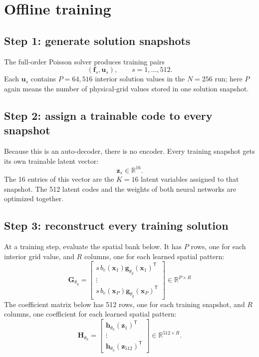 \documentclass[11pt]{article}
\newcommand{\mat}[1]{\mathbf{#1}}
\newcommand{\vect}[1]{\mathbf{#1}}
\newcommand{\R}{\mathbb{R}}
\begin{document}
\section{Offline training}

\subsection{Step 1: generate solution snapshots}

The full-order Poisson solver produces training pairs
\begin{equation}
  (\vect{f}_s,\vect{u}_s),
  \qquad s=1,\ldots,512.
\end{equation}
Each $\vect{u}_s$ contains $P=64{,}516$ interior solution values in the
$N=256$ run; here $P$ again means the number of physical-grid values stored in
one solution snapshot.

\subsection{Step 2: assign a trainable code to every snapshot}

Because this is an auto-decoder, there is no encoder.  Every training snapshot
gets its own trainable latent vector:
\begin{equation}
  \vect{z}_s\in\R^{16}.
\end{equation}
The 16 entries of this vector are the $K=16$ latent variables assigned to that
snapshot.  The 512 latent codes and the weights of both neural networks are
optimized together.

\subsection{Step 3: reconstruct every training solution}

At a training step, evaluate the spatial bank below.  It has $P$ rows, one for
each interior grid value, and $R$ columns, one for each learned spatial pattern:
\begin{equation}
  \mat{G}_{\theta_g}
  = \begin{bmatrix}
      s\,b_c(\vect{x}_1)\vect{g}_{\theta_g}(\vect{x}_1)^{\mathsf T}\\
      \vdots\\
      s\,b_c(\vect{x}_P)\vect{g}_{\theta_g}(\vect{x}_P)^{\mathsf T}
    \end{bmatrix}
  \in\R^{P\times R}
\end{equation}
The coefficient matrix below has 512 rows, one for each training snapshot, and
$R$ columns, one coefficient for each learned spatial pattern:
\begin{equation}
  \mat{H}_{\theta_h}
  = \begin{bmatrix}
      \vect{h}_{\theta_h}(\vect{z}_1)^{\mathsf T}\\
      \vdots\\
      \vect{h}_{\theta_h}(\vect{z}_{512})^{\mathsf T}
    \end{bmatrix}
  \in\R^{512\times R}.
\end{equation}
\end{document}
